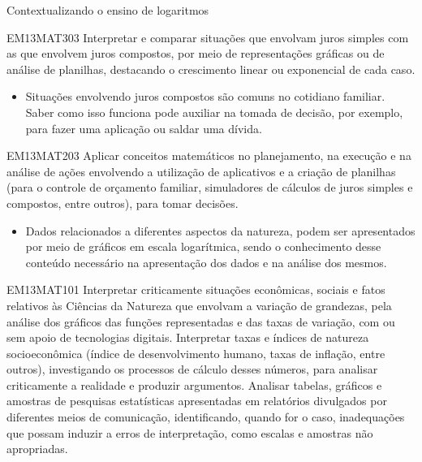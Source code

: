 \begin{apresentacao}{Contextualizando o ensino de logaritmos}
\begin{habilities}{EM13MAT303}
Interpretar e comparar situações que envolvam juros simples com as que envolvem juros compostos, por meio de representações gráficas ou de análise de planilhas, destacando o crescimento linear ou exponencial de cada caso.
\end{habilities}

\columnbreak
\begin{itemize}
\item Situações envolvendo juros compostos são comuns no cotidiano familiar. Saber como isso funciona pode auxiliar na tomada de decisão, por exemplo, para fazer uma aplicação ou saldar uma dívida.
\end{itemize}

\begin{habilities}{EM13MAT203}
Aplicar conceitos matemáticos no planejamento, na execução e na análise de ações envolvendo a utilização de aplicativos e a criação de planilhas (para o controle de orçamento familiar, simuladores de cálculos de juros simples e compostos, entre outros), para tomar decisões.
\end{habilities}

\begin{itemize}
\item Dados relacionados a diferentes aspectos da natureza, podem ser apresentados por meio de gráficos em escala logarítmica, sendo o conhecimento desse conteúdo necessário na apresentação dos dados e na análise dos mesmos.
\end{itemize}

\begin{habilities}{EM13MAT101}
Interpretar criticamente situações econômicas, sociais e fatos relativos às Ciências da Natureza que envolvam a variação de grandezas, pela análise dos gráficos das funções representadas e das taxas de variação, com ou sem apoio de tecnologias digitais.
Interpretar taxas e índices de natureza socioeconômica (índice de desenvolvimento humano, taxas de inflação, entre outros), investigando os processos de cálculo desses números, para analisar criticamente a realidade e produzir argumentos.
 Analisar tabelas, gráficos e amostras de pesquisas estatísticas apresentadas em relatórios divulgados por diferentes meios de comunicação, identificando, quando for o caso, inadequações que possam induzir a erros de interpretação, como escalas e amostras não apropriadas.
\end{habilities}




\end{apresentacao}
